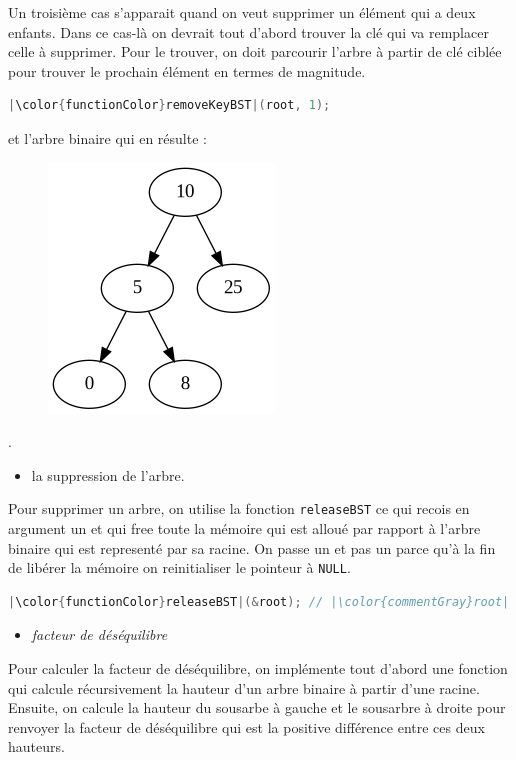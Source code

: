 \documentclass[10pt]{article} %
\begin{document}
Un troisième cas s'apparait quand on veut supprimer un élément qui a deux enfants. Dans ce cas-là on devrait tout d'abord trouver
la clé qui va remplacer celle à supprimer. Pour le trouver, on doit parcourir l'arbre à partir de clé ciblée pour trouver le prochain élément en
termes de magnitude.

\begin{lstlisting}[language=C, keywordstyle=\color{objectPurp}, otherkeywords={root}]
    |\color{functionColor}removeKeyBST|(root, 1);
\end{lstlisting}

et l'arbre binaire qui en résulte :

\newpage

\begin{figure}[h!]
    \centering
    \includegraphics[width=.25\textwidth]{media/rem1.png}
\end{figure}.

\begin{itemize}
    \item [\ding{43}] la suppression de l'arbre.
\end{itemize}

Pour supprimer un arbre, on utilise la fonction \texttt{releaseBST} ce qui recois en argument un  et qui free toute la mémoire qui est alloué par rapport à l'arbre binaire qui est
representé par sa racine. On passe un  et pas un  parce qu'à la fin de
libérer la mémoire on reinitialiser le pointeur à \texttt{NULL}.

\begin{lstlisting}[language=C, keywordstyle=\color{objectPurp}, otherkeywords={root}]
    |\color{functionColor}releaseBST|(&root); // |\color{commentGray}root| -> NULL
\end{lstlisting}

\begin{itemize}
    \item [\ding{43}] \textit{facteur de déséquilibre}
\end{itemize}

Pour calculer la facteur de déséquilibre, on implémente tout d'abord une fonction qui calcule récursivement la hauteur d'un
arbre binaire à partir d'une racine. Ensuite, on calcule la hauteur du sousarbe à gauche et le sousarbre à droite pour renvoyer la
facteur de déséquilibre qui est la positive différence entre ces deux hauteurs.
\end{document}

